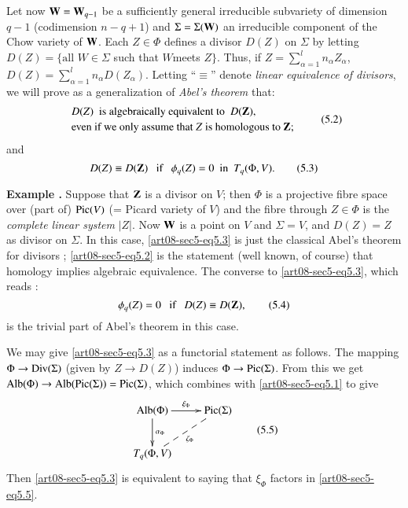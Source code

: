 Let now $\mathbf{W}=\mathbf{W}_{q-1}$ be a sufficiently general irreducible subvariety of dimension $q-1$ (codimension $n-q+1$) and $\Sigma=\Sigma(\mathbf{W})$ an irreducible component of the Chow variety of $\mathbf{W}$. Each $Z\in \Phi$ defines a divisor $D(Z)$ on $\Sigma$ by letting $D(Z)=\{\text{all~}W\in \Sigma$ such that $W$\pageoriginale meets $Z\}$. Thus, if $Z=\sum\limits^{l}_{\alpha=1}n_{\alpha}Z_{\alpha}$, $D(Z)=\sum\limits^{l}_{\alpha=1}n_{\alpha}D(Z_{\alpha})$. Letting ``$\equiv$'' denote {\em linear equivalence of divisors}, we will prove as a generalization of {\em Abel's theorem} that:
\begin{equation*}
\begin{array}{l}
D(Z)\text{~ is algebraically equivalent to~ } D(\mathbf{Z}),\\[2pt]
\text{even if we only assume that $Z$ is homologous to $\mathbf{Z}$};
\end{array}\tag{5.2}\label{art08-sec5-eq5.2}
\end{equation*}
and
\begin{equation*}
D(Z)\equiv D(\mathbf{Z})\text{~~ if~~ }\phi_{q}(Z)=0\text{~ in~ }T_{q}(\Phi,V).\tag{5.3}\label{art08-sec5-eq5.3}
\end{equation*}

\medskip
\noindent
{\bf Example .\label{art08-sec5-exam1}}
Suppose that $\mathbf{Z}$ is a divisor on $V$; then $\Phi$ is a projective fibre space over (part of) $\operatorname{\mathrm{Pic}}(V)$ (= Picard variety of $V$) and the fibre through $Z\in \Phi$ is the {\em complete linear system} $|Z|$. Now $\mathbf{W}$ is a point on $V$ and $\Sigma=V$, and $D(Z)=Z$ as divisor on $\Sigma$. In this case, \eqref{art08-sec5-eq5.3} is just the classical Abel's theorem for divisors \cite{art08-key17}; \eqref{art08-sec5-eq5.2} is the statement (well known, of course) that homology implies algebraic equivalence. The converse to \eqref{art08-sec5-eq5.3}, which reads :
\begin{equation*}
\phi_{q}(Z)=0\text{~~ if~~ } D(Z)\equiv D(\mathbf{Z}),\tag{5.4}\label{art08-sec5-eq5.4}
\end{equation*}
is the trivial part of Abel's theorem in this case.

\begin{remark*}
We may give \eqref{art08-sec5-eq5.3} as a functorial statement as follows. The mapping $\Phi\to \operatorname{\mathrm{Div}}(\Sigma)$ (given by $Z\to D(Z)$) induces $\Phi\to \operatorname{\mathrm{Pic}}(\Sigma)$. From this we get $\operatorname{\mathrm{Alb}}(\Phi)\to \operatorname{\mathrm{Alb}}(\operatorname{\mathrm{Pic}}(\Sigma))=\operatorname{\mathrm{Pic}}(\Sigma)$, which combines with \eqref{art08-sec5-eq5.1} to give
\begin{equation*}
\vcenter{\xymatrix{
\Alb(\Phi)\ar[d]^-{\alpha_{\Phi}}\ar[r]^-{\xi_{\Phi}} & \Pic(\Sigma)\\
T_{q}(\Phi,V)\ar@{--}[ur]_{\zeta_{\Phi}} &
}}\tag{5.5}\label{art08-sec5-eq5.5}
\end{equation*}
Then \eqref{art08-sec5-eq5.3} is equivalent to saying that $\xi_{\Phi}$ factors in \eqref{art08-sec5-eq5.5}.
\end{remark*}

